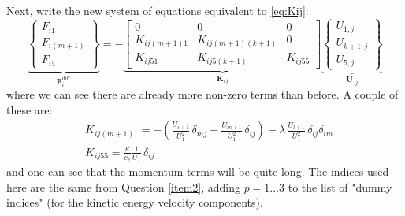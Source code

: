 \documentclass{ucb}
\begin{document}
\begin{enumerate}
Next, write the new system of equations equivalent to \autoref{eq:Kij}:
\begin{equation}
    \underbrace{
        \begin{Bmatrix}
            F_{i1} \\
            F_{i(m+1)} \\
            F_{i5}
        \end{Bmatrix}
    }_{\bm{F}_i^\mathrm{diff}}
    =
    -
    \underbrace{
        \begin{bmatrix}
            0 & 0 & 0 \\
            K_{ij(m+1)1} & K_{ij(m+1)(k+1)} & 0 \\
            K_{ij51} & K_{ij5(k+1)} & K_{ij55}
        \end{bmatrix}
    }_{\bm{K}_{ij}}
    \underbrace{
        \begin{Bmatrix}
            U_{1,j} \\
            U_{k+1,j} \\
            U_{5,j}
        \end{Bmatrix}
    }_{\bm{U}_{,j}}
\end{equation}
where we can see there are already more non-zero terms than before. A couple of these are:
\begin{equation}
    \begin{aligned}
        &K_{ij(m+1)1} = -\left(\frac{U_{i+1}}{U_1^2}\,\delta_{mj} + \frac{U_{m+1}}{U_1^2}\,\delta_{ij}\right) -\lambda\,\frac{U_{l+1}}{U_1^2}\,\delta_{lj}\delta_{im} \\
        &K_{ij55} = \frac{\kappa}{c_v}\frac{1}{U_1}\,\delta_{ij}
    \end{aligned}
\end{equation}
and one can see that the momentum terms will be quite long. The indices used here are the same from Question \ref{item2}, adding $p = 1 \ldots 3$ to the list of "dummy indices" (for the kinetic energy velocity components).

\end{enumerate}
\end{document}
